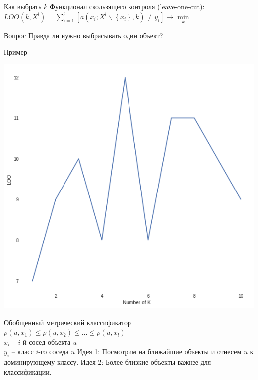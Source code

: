 \documentclass[10pt]{beamer}
\begin{document}
\begin{frame}{Как выбрать $k$}
	Функционал скользящего контроля (leave-one-out):\\
	\bigbreak
	${LOO(k, X^l) = \sum\limits_{i=1}^l [a(x_i; X^l \backslash \left\{x_i\right\}, k) \neq y_i] \rightarrow \min\limits_k}$\\
\end{frame}

\begin{frame}{Вопрос}
  \centering
	Правда ли нужно выбрасывать один объект?
\end{frame}

\begin{frame}{Пример}
	\begin{center}
	  \includegraphics[width=\textwidth, height=0.8 \textheight, keepaspectratio]{images/loo}
	\end{center}
\end{frame}

\begin{frame}{Обобщенный метрический классификатор}
	${\rho(u, x_1) \leq \rho(u, x_2) \leq \dots \leq \rho(u, x_l)}$\\
	\bigbreak
	${x_i}$ -- $i$-й сосед объекта $u$\\
	${y_i}$ -- класс $i$-го соседа $u$
  \bigbreak
  \alert{Идея 1}: Посмотрим на ближайшие объекты и отнесем $u$ к доминирующему классу. 
  \bigbreak
  \pause
  \alert{Идея 2}: Более близкие объекты важнее для классификации.
\end{frame}
\end{document}
